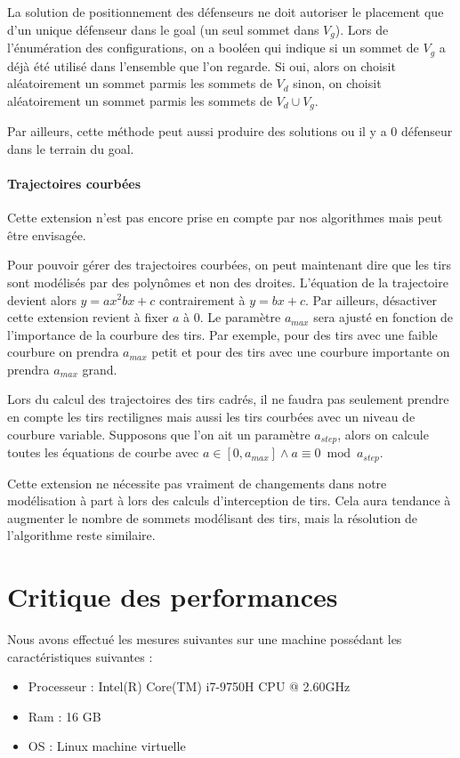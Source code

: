 \documentclass[12pt]{article}
\begin{document}
La solution de positionnement des défenseurs ne doit autoriser le placement que d'un unique défenseur dans le goal (un seul sommet dans $V_g$).
Lors de l'énumération des configurations, on a booléen qui indique si un sommet de $V_g$ a déjà été utilisé dans l'ensemble que l'on regarde. Si oui, alors on choisit aléatoirement un sommet parmis les sommets de $V_d$ sinon, on choisit aléatoirement un sommet parmis les sommets de $V_d \cup V_g$.

Par ailleurs, cette méthode peut aussi produire des solutions ou il y a 0 défenseur dans le terrain du goal.

\paragraph{Trajectoires courbées}
Cette extension n'est pas encore prise en compte par nos algorithmes mais peut être envisagée.

Pour pouvoir gérer des trajectoires courbées, on peut maintenant dire que les tirs sont modélisés par des polynômes et non des droites. L'équation de la trajectoire devient alors $y = ax^2 bx + c$ contrairement à $y = bx+c$. Par ailleurs, désactiver cette extension revient à fixer $a$ à 0. Le paramètre $a_{max}$ sera ajusté en fonction de l'importance de la courbure des tirs. Par exemple, pour des tirs avec une faible courbure on prendra $a_{max}$ petit et pour des tirs avec une courbure importante on prendra $a_{max}$ grand.

Lors du calcul des trajectoires des tirs cadrés, il ne faudra pas seulement prendre en compte les tirs rectilignes mais aussi les tirs courbées avec un niveau de courbure variable. Supposons que l'on ait un paramètre $a_{step}$, alors on calcule toutes les équations de courbe avec $a \in [0, a_{max}] \wedge a \equiv 0 \bmod a_{step}$.

Cette extension ne nécessite pas vraiment de changements dans notre modélisation à part à lors des calculs d'interception de tirs. Cela aura tendance à augmenter le nombre de sommets modélisant des tirs, mais la résolution de l'algorithme reste similaire.

\section{Critique des performances}

Nous avons effectué les mesures suivantes sur une machine possédant les caractéristiques suivantes :

\begin{itemize}
  \item Processeur : Intel(R) Core(TM) i7-9750H CPU @ 2.60GHz
  \item Ram : 16 GB
  \item OS : Linux machine virtuelle
\end{itemize}
\end{document}
